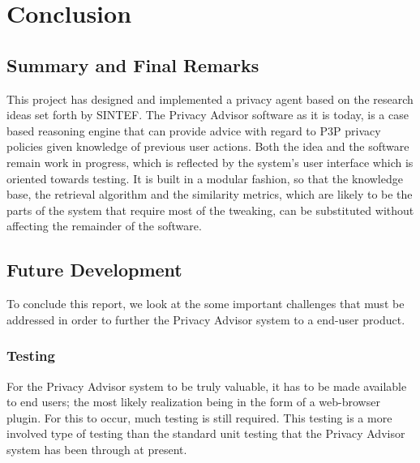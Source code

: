  

\chapter{Conclusion}\label{conclusion}

\minitoc

\section{Summary and Final Remarks}

This project has designed and implemented a privacy agent based on the
research ideas set forth by SINTEF. The Privacy Advisor software as it
is today, is a case based reasoning engine that can provide advice
with regard to P3P privacy policies given knowledge of previous user
actions. Both the idea and the software remain work in progress,
which is reflected by the system's user interface which is oriented
towards testing. It is built in a modular fashion, so that the
knowledge base, the retrieval algorithm and the similarity metrics, which are likely to be the
parts of the system that require most of the tweaking, can
be substituted without affecting the remainder of the software.



\section{Future Development}

To conclude this report, we look at the some important challenges that
must be addressed in order to further the Privacy Advisor system to a
end-user product.

\subsection{Testing}
For the Privacy Advisor system to be truly valuable, it has to be made
available to end users; the most likely realization being in the
form of a web-browser plugin. For this to occur, much testing is still
required. This testing is a more involved type of testing than the standard
unit testing that the Privacy Advisor system has been through at present.

